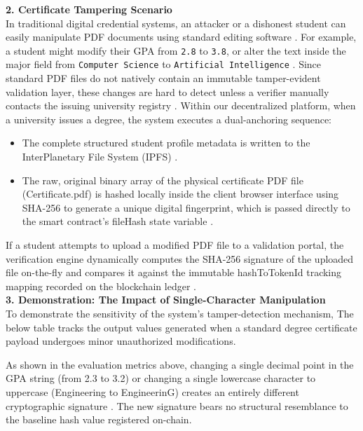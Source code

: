 \textbf{2. Certificate Tampering Scenario}\\

In traditional digital credential systems, an attacker or a dishonest student can easily manipulate PDF documents using standard editing software \cite{kumutha2021blockchainacdaemic}. For example, a student might modify their GPA from \texttt{2.8} to \texttt{3.8}, or alter the text inside the major field from \texttt{Computer Science} to \texttt{Artificial Intelligence} \cite{perez2020smartcontracts}. Since standard PDF files do not natively contain an immutable tamper-evident validation layer, these changes are hard to detect unless a verifier manually contacts the issuing university registry \cite{khati2023studentcert}. Within our decentralized platform, when a university issues a degree, the system executes a dual-anchoring sequence:

\begin{itemize}
    \item The complete structured student profile metadata is written to the InterPlanetary File System (IPFS) \cite{benet2014ipfs}.

    \item The raw, original binary array of the physical certificate PDF file (Certificate.pdf) is hashed locally inside the client browser interface using SHA-256 to generate a unique digital fingerprint, which is passed directly to the smart contract’s fileHash state variable \cite{onlinev0835web}.
\end{itemize}

If a student attempts to upload a modified PDF file to a validation portal, the verification engine dynamically computes the SHA-256 signature of the uploaded file on-the-fly and compares it against the immutable hashToTokenId tracking mapping recorded on the blockchain ledger \cite{nfterc721web}.\\

\textbf{3. Demonstration: The Impact of Single-Character Manipulation}\\

To demonstrate the sensitivity of the system's tamper-detection mechanism, The below table tracks the output values generated when a standard degree certificate payload undergoes minor unauthorized modifications.



As shown in the evaluation metrics above, changing a single decimal point in the GPA string (from 2.3 to 3.2) or changing a single lowercase character to uppercase (Engineering to EngineerinG) creates an entirely different cryptographic signature \cite{blockchainineducation}. The new signature bears no structural resemblance to the baseline hash value registered on-chain.\\


